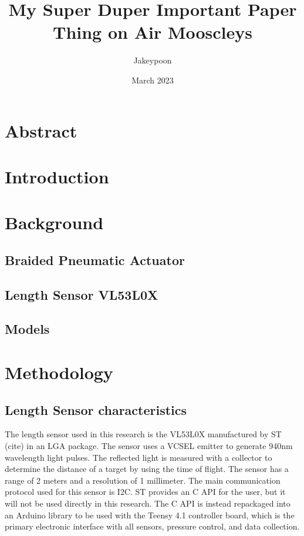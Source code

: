 \documentclass[letterpaper,11pt]{article}
\title{My Super Duper Important Paper Thing on Air Mooscleys}
\author{Jakeypoon}
\date{March 2023}
\begin{document}
\maketitle

\newpage

\tableofcontents

\newpage

\section{Abstract}

\section{Introduction}

\section{Background}

\subsection{Braided Pneumatic Actuator}

\subsection{Length Sensor VL53L0X}

\subsection{Models}

\section{Methodology}

\subsection{Length Sensor characteristics}

The length sensor used in this research is the VL53L0X manufactured by ST (cite) in an LGA package. The sensor uses a VCSEL emitter to generate 940nm wavelength light pulses. The reflected light is measured with a collector to determine the distance of a target by using the time of flight. The sensor has a range of 2 meters and a resolution of 1 millimeter. The main communication protocol used for this sensor is I2C. ST provides an C API for the user, but it will not be used directly in this research. The C API is instead repackaged into an Arduino library to be used with the Teensy 4.1 controller board, which is the primary electronic interface with all sensors, pressure control, and data collection.\\
\end{document}

